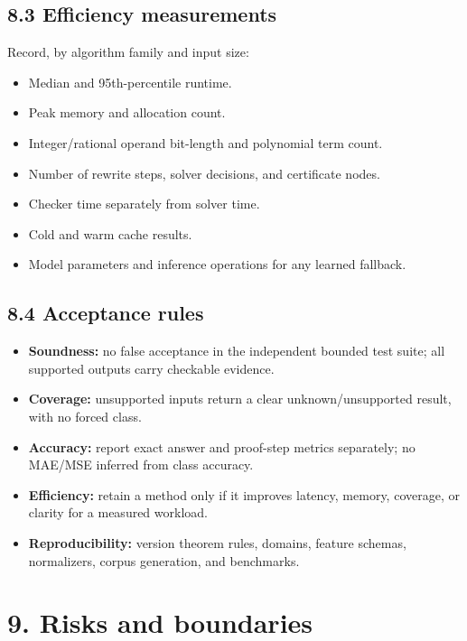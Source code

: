 \documentclass[
  10pt,
]{article}
\providecommand{\tightlist}{%
  \setlength{\itemsep}{0pt}\setlength{\parskip}{0pt}}
\begin{document}
\subsection{8.3 Efficiency measurements}\label{efficiency-measurements}

Record, by algorithm family and input size:

\begin{itemize}
\tightlist
\item
  Median and 95th-percentile runtime.
\item
  Peak memory and allocation count.
\item
  Integer/rational operand bit-length and polynomial term count.
\item
  Number of rewrite steps, solver decisions, and certificate nodes.
\item
  Checker time separately from solver time.
\item
  Cold and warm cache results.
\item
  Model parameters and inference operations for any learned fallback.
\end{itemize}

\subsection{8.4 Acceptance rules}\label{acceptance-rules}

\begin{itemize}
\tightlist
\item
  \textbf{Soundness:} no false acceptance in the independent bounded
  test suite; all supported outputs carry checkable evidence.
\item
  \textbf{Coverage:} unsupported inputs return a clear
  unknown/unsupported result, with no forced class.
\item
  \textbf{Accuracy:} report exact answer and proof-step metrics
  separately; no MAE/MSE inferred from class accuracy.
\item
  \textbf{Efficiency:} retain a method only if it improves latency,
  memory, coverage, or clarity for a measured workload.
\item
  \textbf{Reproducibility:} version theorem rules, domains, feature
  schemas, normalizers, corpus generation, and benchmarks.
\end{itemize}

\section{9. Risks and boundaries}\label{risks-and-boundaries}
\end{document}
